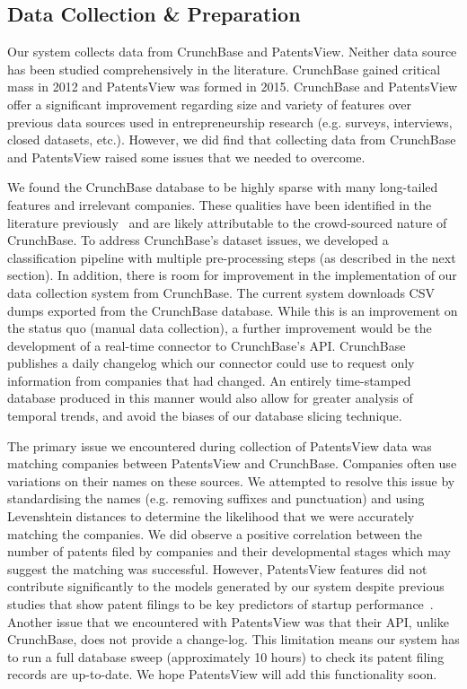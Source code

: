 \documentclass[../thesis/thesis.tex]{subfiles}
\begin{document}
\subsection{Data Collection \& Preparation}

Our system collects data from CrunchBase and PatentsView. Neither data source has been studied comprehensively in the literature. CrunchBase gained critical mass in 2012 and PatentsView was formed in 2015. CrunchBase and PatentsView offer a significant improvement regarding size and variety of features over previous data sources used in entrepreneurship research (e.g. surveys, interviews, closed datasets, etc.). However, we did find that collecting data from CrunchBase and PatentsView raised some issues that we needed to overcome.

We found the CrunchBase database to be highly sparse with many long-tailed features and irrelevant companies. These qualities have been identified in the literature previously~\cite{xiang2012} and are likely attributable to the crowd-sourced nature of CrunchBase. To address CrunchBase's dataset issues, we developed a classification pipeline with multiple pre-processing steps (as described in the next section). In addition, there is room for improvement in the implementation of our data collection system from CrunchBase. The current system downloads CSV dumps exported from the CrunchBase database. While this is an improvement on the status quo (manual data collection), a further improvement would be the development of a real-time connector to CrunchBase's API. CrunchBase publishes a daily changelog which our connector could use to request only information from companies that had changed. An entirely time-stamped database produced in this manner would also allow for greater analysis of temporal trends, and avoid the biases of our database slicing technique.

The primary issue we encountered during collection of PatentsView data was matching companies between PatentsView and CrunchBase. Companies often use variations on their names on these sources. We attempted to resolve this issue by standardising the names (e.g. removing suffixes and punctuation) and using Levenshtein distances to determine the likelihood that we were accurately matching the companies. We did observe a positive correlation between the number of patents filed by companies and their developmental stages which may suggest the matching was successful. However, PatentsView features did not contribute significantly to the models generated by our system despite previous studies that show patent filings to be key predictors of startup performance~\cite{hoenen2014,baum2004}. Another issue that we encountered with PatentsView was that their API, unlike CrunchBase, does not provide a change-log. This limitation means our system has to run a full database sweep (approximately 10 hours) to check its patent filing records are up-to-date. We hope PatentsView will add this functionality soon.
\end{document}
